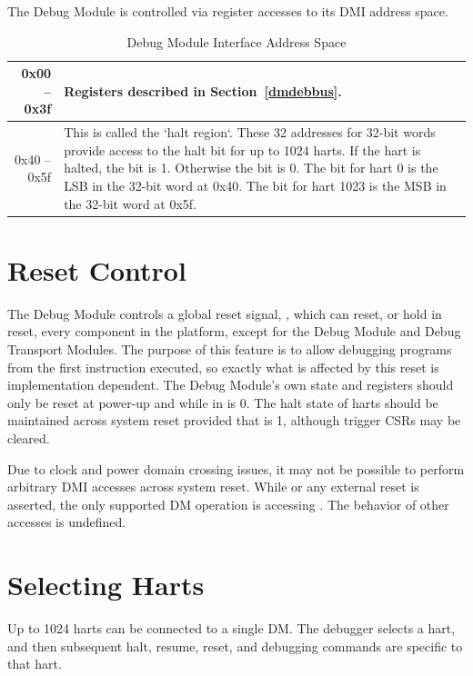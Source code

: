 The Debug Module is controlled via register accesses to its DMI address space.

\begin{table}[htp]
    \centering
    \caption{Debug Module Interface Address Space}
    \label{tab:header}
    \begin{tabulary}{\textwidth}{|r|L|}
        \hline
        0x00 -- 0x3f & Registers described in Section~\ref{dmdebbus}. \\
        \hline
        0x40 -- 0x5f & This is called the `halt region`.  These 32 addresses
        for 32-bit words provide access to the halt bit for up to 1024 harts.
        If the hart is halted, the bit is 1.  Otherwise
        the bit is 0. The bit for hart 0 is the LSB in the 32-bit word at 0x40.
        The bit for hart 1023 is the MSB in the 32-bit word at 0x5f. \\
        \hline
    \end{tabulary}
\end{table}

\section{Reset Control} \label{reset}

The Debug Module controls a global reset signal, \Fndmreset,
which can reset, or hold in reset, every component in the platform,
except for the Debug Module and Debug
Transport Modules. The purpose of this feature is to allow debugging
programs from the first instruction executed, so exactly what is affected
by this reset is implementation dependent.
The Debug Module's own state and registers should only be
reset at power-up and while
\Fdmactive in \Rdmcontrol is 0.
The halt state of harts should be
maintained across system reset provided that \Fdmactive is 1,
although trigger CSRs may be cleared.

Due to clock and power domain crossing issues,
it may not be possible to perform arbitrary DMI accesses across
system reset.
While \Fndmreset or any external reset is asserted, the only supported DM
operation is accessing \Rdmcontrol. The behavior of other accesses is
undefined.

\section{Selecting Harts} \label{selectingharts}

Up to 1024 harts can be connected to a single DM. The debugger
selects a hart, and then subsequent halt, resume, reset, and debugging
commands are specific to that hart.

